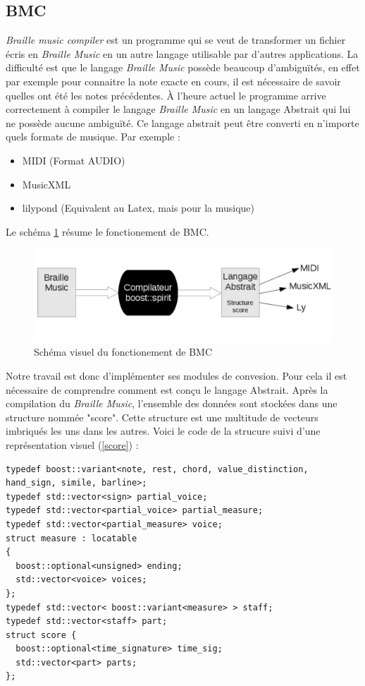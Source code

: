 \subsection{BMC}


\textit{Braille music compiler} est un programme qui se veut de
transformer un fichier écris en \textit{Braille Music} en un autre langage
utilisable par d'autres applications. La difficulté est que le langage
\textit{Braille Music} possède beaucoup d'ambiguïtés, en effet par exemple
pour connaitre la note exacte en cours, il est nécessaire de savoir
quelles ont été les notes précédentes. À l'heure actuel le programme
arrive correctement à compiler le langage \textit{Braille Music} en un
langage Abstrait qui lui ne possède aucune ambiguïté. Ce langage
abstrait peut être converti en n'importe quels formats de musique. Par
exemple : 

\begin{itemize}
\item MIDI (Format AUDIO)
\item MusicXML 
\item lilypond (Equivalent au Latex, mais pour la musique)
\end{itemize}
Le schéma \ref{compiler} résume le fonctionement de BMC.

\begin{figure}[!h]
  \centering
  \includegraphics[width=1\textwidth]{images/fonction-bmc.png}
  \caption{Schéma visuel du fonctionement de BMC}
  \label{compiler}
\end{figure}

Notre travail est donc d'implémenter ses modules de convesion. Pour
cela il est nécessaire de comprendre comment est conçu le langage
Abstrait. Après la compilation du \textit{Braille Music}, l'ensemble des
données sont stockées dans une structure nommée "score". Cette
structure est une multitude de vecteurs imbriqués les uns dans les
autres. Voici le code de la strucure suivi d'une représentation visuel (\ref{score})
:

\begin{verbatim}
typedef boost::variant<note, rest, chord, value_distinction, hand_sign, simile, barline>;
typedef std::vector<sign> partial_voice;
typedef std::vector<partial_voice> partial_measure;
typedef std::vector<partial_measure> voice;
struct measure : locatable
{
  boost::optional<unsigned> ending;
  std::vector<voice> voices;
};
typedef std::vector< boost::variant<measure> > staff;
typedef std::vector<staff> part;
struct score {
  boost::optional<time_signature> time_sig;
  std::vector<part> parts;
};
\end{verbatim}


